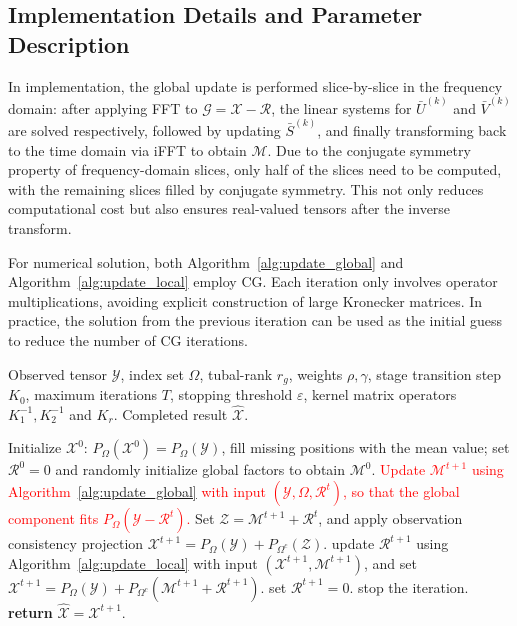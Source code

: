 \documentclass[a4paper,12pt]{article}
\numberwithin{equation}{section}
\numberwithin{algorithm}{section}
\newcommand{\rev}[1]{\textcolor{red}{#1}}
\theoremstyle{remark}
\theoremstyle{definition}
\begin{document}
\subsection{Implementation Details and Parameter Description}
\label{sec:impl}
In implementation, the global update is performed slice-by-slice in the frequency domain: after applying FFT to $\mathcal{G}=\mathcal{X}-\mathcal{R}$, the linear systems for $\bar U^{(k)}$ and $\bar V^{(k)}$ are solved respectively, followed by updating $\bar S^{(k)}$, and finally transforming back to the time domain via iFFT to obtain $\mathcal{M}$. Due to the conjugate symmetry property of frequency-domain slices, only half of the slices need to be computed, with the remaining slices filled by conjugate symmetry. This not only reduces computational cost but also ensures real-valued tensors after the inverse transform.

For numerical solution, both Algorithm~\ref{alg:update_global} and Algorithm~\ref{alg:update_local} employ CG. Each iteration only involves operator multiplications, avoiding explicit construction of large Kronecker matrices. In practice, the solution from the previous iteration can be used as the initial guess to reduce the number of CG iterations.

\begin{algorithm}[!htbp]
	\caption{Overall Update Procedure}
	\label{alg:overall}
	\begin{algorithmic}[1]
		\REQUIRE Observed tensor $\mathcal{Y}$, index set $\Omega$, tubal-rank $r_g$, weights $\rho,\gamma$, stage transition step $K_0$, maximum iterations $T$, stopping threshold $\varepsilon$, kernel matrix operators $K_1^{-1},K_2^{-1}$ and $K_r$.
		\ENSURE Completed result $\widehat{\mathcal{X}}$.
		
		\STATE Initialize $\mathcal{X}^{0}$: $P_{\Omega}(\mathcal{X}^{0})=P_{\Omega}(\mathcal{Y})$, fill missing positions with the mean value; set $\mathcal{R}^{0}=0$ and {\color{blue} randomly initialize global factors to obtain} $\mathcal{M}^{0}$.
		\STATE \rev{Update $\mathcal{M}^{t+1}$ using Algorithm~\ref{alg:update_global} with input $(\mathcal{Y},\Omega,\mathcal{R}^{t})$, so that the global component fits $P_{\Omega}(\mathcal{Y}-\mathcal{R}^{t})$.}
		\STATE Set $\mathcal{Z}=\mathcal{M}^{t+1}+\mathcal{R}^{t}$, and apply observation consistency projection $\mathcal{X}^{t+1}=P_{\Omega}(\mathcal{Y})+P_{\Omega^c}(\mathcal{Z})$.
		\STATE update $\mathcal{R}^{t+1}$ using Algorithm~\ref{alg:update_local} with input $(\mathcal{X}^{t+1},\mathcal{M}^{t+1})$, and set $\mathcal{X}^{t+1}=P_{\Omega}(\mathcal{Y})+P_{\Omega^c}(\mathcal{M}^{t+1}+\mathcal{R}^{t+1})$. \ELSE
		\STATE set $\mathcal{R}^{t+1}=0$.
		\ENDIF
		\STATE stop the iteration.
		\ENDIF
		\ENDFOR
		\STATE \textbf{return} $\widehat{\mathcal{X}}=\mathcal{X}^{t+1}$.
	\end{algorithmic}
\end{algorithm}
\end{document}
